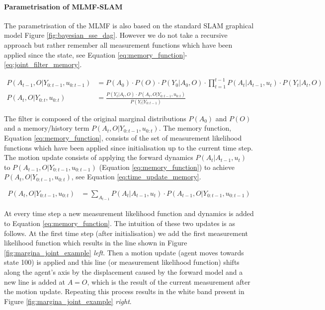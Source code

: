 \paragraph{Parametrisation of MLMF-SLAM}

The parametrisation of the MLMF is also based on the standard SLAM graphical model Figure \ref{fig:bayesian_sse_dag}. However
we do not take a recursive approach but rather remember all measurement functions which have been applied since 
the state, see Equation \ref{eq:memory_function}-\ref{eq:joint_filter_memory}.

\begin{align} 
 P(A_{t-1},O|Y_{0:t-1},u_{0:t-1}) &= P(A_0) \cdot P(O)  \cdot  P(Y_0|A_0,O) \cdot \prod\limits_{t=1}^{t-1} P(A_t|A_{t-1},u_t) \cdot P(Y_t|A_t,O) \label{eq:memory_function} \\
 P(A_t,O|Y_{0:t},u_{0:t})         &= \frac{P(Y_t|A_t,O) \cdot  P(A_t,O|Y_{0:t-1},u_{0:t})  }{  P(Y_t|Y_{0:t-1}) } \label{eq:joint_filter_memory}
\end{align}

The filter is composed of the original marginal distributions $P(A_0)$ and $P(O)$ and a memory/history term $P(A_{t},O|Y_{0:t-1},u_{0:t})$. 
The memory function, Equation \ref{eq:memory_function}, consists of the set of measurement likelihood functions which have been applied 
since initialisation up to the current time step. The motion update consists of applying the forward dynamics $P(A_t|A_{t-1},u_t)$ to 
$P(A_{t-1},O|Y_{0:t-1},u_{0:t-1})$ (Equation \ref{eq:memory_function}) to achieve $P(A_t,O|Y_{0:t-1},u_{0:t})$, see Equation \ref{eq:time_update_memory}. 

\begin{align}\label{eq:time_update_memory}
 P(A_t,O|Y_{0:t-1},u_{0:t}) &= \sum\limits_{A_{t-1}} P(A_t|A_{t-1},u_t) \cdot  P(A_{t-1},O|Y_{0:t-1},u_{0:t-1})
 \end{align}

At every time step a new measurement likelihood function and dynamics is added to Equation \ref{eq:memory_function}.
The intuition of these two updates is as follows. At the first time step (after initialisation) we add the first measurement 
likelihood function which results in the line shown in Figure \ref{fig:margina_joint_example} \textit{left}. 
Then a motion update (agent moves towards state 100) is applied and this line (or measurement
likelihood function) shifts along the agent's axis by the displacement caused by the forward model and a new line is added at $A=O$, 
which is the result of the current measurement after the motion update. Repeating this process results in the white band present 
in Figure \ref{fig:margina_joint_example} \textit{right}. 


